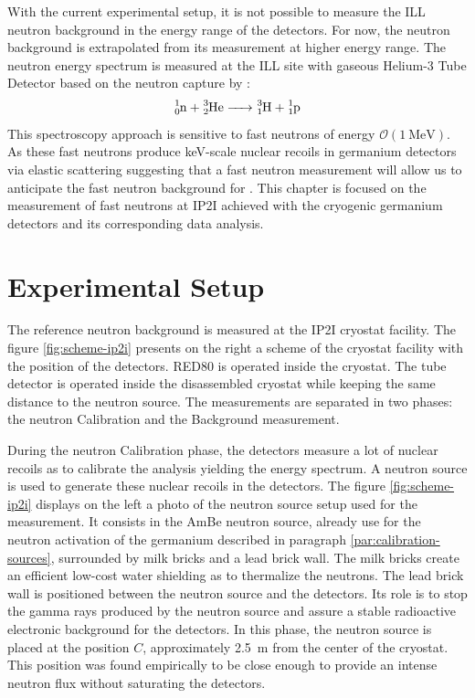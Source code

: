 With the current experimental setup, it is not possible to measure the ILL neutron background in the energy range of the detectors. 
For now, the neutron background is extrapolated from its measurement at higher energy range.
The neutron energy spectrum is measured at the ILL site with gaseous Helium-3 Tube Detector based on the neutron capture by :
\begin{equation}
	\ce{^1_0n + ^3_2He -> ^3_1H + ^1_1p}
\end{equation}
This spectroscopy approach is sensitive to fast neutrons of energy $\mathcal{O}(\SI{1}{\mega\eV})$. As these fast neutrons produce \si{\kilo\eV}-scale nuclear recoils in germanium detectors via elastic scattering suggesting that a  fast neutron measurement will allow us to anticipate the fast neutron background for \Ricochet{}.
This chapter is focused on the measurement of fast neutrons at IP2I achieved with the cryogenic germanium detectors and its corresponding data analysis.


\section{Experimental Setup}

The reference neutron background is measured at the IP2I cryostat facility. 
The figure \ref{fig:scheme-ip2i} presents on the right a scheme of the cryostat facility with the position of the detectors. RED80 is operated inside the cryostat. The  tube detector is operated inside the disassembled cryostat while keeping the same distance to the neutron source. The measurements are separated in two phases: the neutron Calibration and the Background measurement.

During the neutron Calibration phase, the detectors measure a lot of nuclear recoils as to calibrate the analysis yielding the energy spectrum. A neutron source is used to generate these nuclear recoils in the detectors. The figure \ref{fig:scheme-ip2i} displays on the left a photo of the neutron source setup used for the measurement. It consists in the AmBe neutron source, already use for the neutron activation of the germanium described in paragraph \ref{par:calibration-sources}, surrounded by milk bricks and a lead brick wall. The milk bricks create an efficient low-cost water shielding as to thermalize the neutrons. The lead brick wall is positioned between the neutron source and the detectors. Its role is to stop the gamma rays produced by the neutron source and assure a stable radioactive electronic background for the detectors.
In this phase, the neutron source is placed at the position $C$, approximately \SI{2.5}{\meter} from the center of the cryostat. This position was found empirically to be close enough to provide an intense neutron flux without saturating the detectors.

